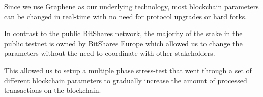 Since we use Graphene as our underlying technology, most blockchain parameters
can be changed in real-time with no need for protocol upgrades or hard forks.

In contrast to the public BitShares network, the majority of the stake in the
public testnet is owned by BitShares Europe which allowed us to change the
parameters without the need to coordinate with other stakeholders.

This allowed us to setup a multiple phase stress-test that went through a set of
different blockchain parameters to gradually increase the amount of
processed transactions on the blockchain.
